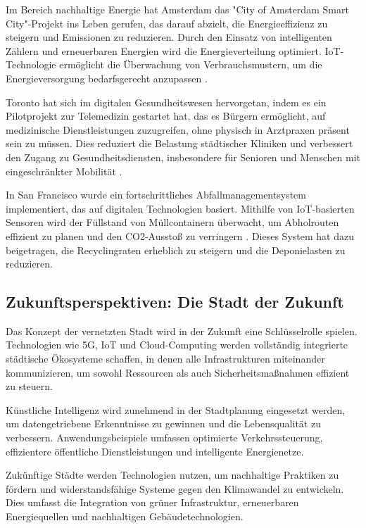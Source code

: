\documentclass[conference,compsoc,final,a4paper, onecolumn, 11pt]{IEEEtran}
\begin{document}
Im Bereich nachhaltige Energie hat Amsterdam das "City of Amsterdam Smart City"-Projekt ins Leben gerufen, das darauf abzielt, die Energieeffizienz zu steigern und Emissionen zu reduzieren. 
Durch den Einsatz von intelligenten Zählern und erneuerbaren Energien wird die Energieverteilung optimiert. 
\ac{IoT}-Technologie ermöglicht die Überwachung von Verbrauchsmustern, um die Energieversorgung bedarfsgerecht anzupassen \autocite{Amsterdam2021}.

Toronto hat sich im digitalen Gesundheitswesen hervorgetan, indem es ein Pilotprojekt zur Telemedizin gestartet hat, das es Bürgern ermöglicht, auf medizinische Dienstleistungen zuzugreifen, ohne physisch in Arztpraxen präsent sein zu müssen. 
Dies reduziert die Belastung städtischer Kliniken und verbessert den Zugang zu Gesundheitsdiensten, insbesondere für Senioren und Menschen mit eingeschränkter Mobilität \autocite{Doe2022}.

In San Francisco wurde ein fortschrittliches Abfallmanagementsystem implementiert, das auf digitalen Technologien basiert. 
Mithilfe von \ac{IoT}-basierten Sensoren wird der Füllstand von Müllcontainern überwacht, um Abholrouten effizient zu planen und den CO2-Ausstoß zu verringern \autocite{Jones2019}. 
Dieses System hat dazu beigetragen, die Recyclingraten erheblich zu steigern und die Deponielasten zu reduzieren.

\subsection{Zukunftsperspektiven: Die Stadt der Zukunft}
Das Konzept der vernetzten Stadt wird in der Zukunft eine Schlüsselrolle spielen. 
Technologien wie 5G, \ac{IoT} und Cloud-Computing werden vollständig integrierte städtische Ökosysteme schaffen, in denen alle Infrastrukturen miteinander kommunizieren, um sowohl Ressourcen als auch Sicherheitsmaßnahmen effizient zu steuern.

Künstliche Intelligenz wird zunehmend in der Stadtplanung eingesetzt werden, um datengetriebene Erkenntnisse zu gewinnen und die Lebensqualität zu verbessern. 
Anwendungsbeispiele umfassen optimierte Verkehrssteuerung, effizientere öffentliche Dienstleistungen und intelligente Energienetze.

Zukünftige Städte werden Technologien nutzen, um nachhaltige Praktiken zu fördern und widerstandsfähige Systeme gegen den Klimawandel zu entwickeln. 
Dies umfasst die Integration von grüner Infrastruktur, erneuerbaren Energiequellen und nachhaltigen Gebäudetechnologien.
\end{document}
